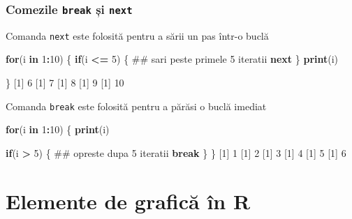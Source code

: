 \documentclass[]{article}
\newenvironment{Shaded}{\begin{snugshade}}{\end{snugshade}}
\newcommand{\KeywordTok}[1]{\textcolor[rgb]{0.13,0.29,0.53}{\textbf{#1}}}
\newcommand{\DecValTok}[1]{\textcolor[rgb]{0.00,0.00,0.81}{#1}}
\newcommand{\StringTok}[1]{\textcolor[rgb]{0.31,0.60,0.02}{#1}}
\newcommand{\ControlFlowTok}[1]{\textcolor[rgb]{0.13,0.29,0.53}{\textbf{#1}}}
\newcommand{\OperatorTok}[1]{\textcolor[rgb]{0.81,0.36,0.00}{\textbf{#1}}}
\newcommand{\NormalTok}[1]{#1}
\newcounter{exo}[section]
\begin{document}
\subsubsection{\texorpdfstring{Comezile \texttt{break} și
\texttt{next}}{Comezile break și next}}\label{comezile-break-si-next}

Comanda \texttt{next} este folosită pentru a sării un pas într-o buclă

\begin{Shaded}
\begin{Highlighting}[]
\ControlFlowTok{for}\NormalTok{(i }\ControlFlowTok{in} \DecValTok{1}\OperatorTok{:}\DecValTok{10}\NormalTok{) \{}
        \ControlFlowTok{if}\NormalTok{(i }\OperatorTok{<=}\StringTok{ }\DecValTok{5}\NormalTok{) \{}
\NormalTok{                ## sari peste primele 5 iteratii}
                \ControlFlowTok{next}                 
\NormalTok{        \}}
  \KeywordTok{print}\NormalTok{(i)}
        
\NormalTok{\}}
\NormalTok{[}\DecValTok{1}\NormalTok{] }\DecValTok{6}
\NormalTok{[}\DecValTok{1}\NormalTok{] }\DecValTok{7}
\NormalTok{[}\DecValTok{1}\NormalTok{] }\DecValTok{8}
\NormalTok{[}\DecValTok{1}\NormalTok{] }\DecValTok{9}
\NormalTok{[}\DecValTok{1}\NormalTok{] }\DecValTok{10}
\end{Highlighting}
\end{Shaded}

Comanda \texttt{break} este folosită pentru a părăsi o buclă imediat

\begin{Shaded}
\begin{Highlighting}[]
\ControlFlowTok{for}\NormalTok{(i }\ControlFlowTok{in} \DecValTok{1}\OperatorTok{:}\DecValTok{10}\NormalTok{) \{}
      \KeywordTok{print}\NormalTok{(i)}

      \ControlFlowTok{if}\NormalTok{(i }\OperatorTok{>}\StringTok{ }\DecValTok{5}\NormalTok{) \{}
\NormalTok{              ## opreste dupa 5 iteratii}
              \ControlFlowTok{break}  
\NormalTok{      \}     }
\NormalTok{\}}
\NormalTok{[}\DecValTok{1}\NormalTok{] }\DecValTok{1}
\NormalTok{[}\DecValTok{1}\NormalTok{] }\DecValTok{2}
\NormalTok{[}\DecValTok{1}\NormalTok{] }\DecValTok{3}
\NormalTok{[}\DecValTok{1}\NormalTok{] }\DecValTok{4}
\NormalTok{[}\DecValTok{1}\NormalTok{] }\DecValTok{5}
\NormalTok{[}\DecValTok{1}\NormalTok{] }\DecValTok{6}
\end{Highlighting}
\end{Shaded}

\section{Elemente de grafică în R}\label{elemente-de-grafica-in-r}
\end{document}

